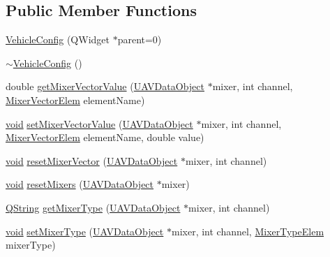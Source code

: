 \subsection*{\-Public \-Member \-Functions}
\begin{DoxyCompactItemize}
\item 
\hyperlink{group___config_plugin_ga369dba1a2bcda89963b25078cbf89fd9}{\-Vehicle\-Config} (\-Q\-Widget $\ast$parent=0)
\item 
\hyperlink{group___config_plugin_ga440451fa05e53fc37b5dfafc439cd681}{$\sim$\-Vehicle\-Config} ()
\item 
double \hyperlink{group___config_plugin_ga0d65103b0dfd7aa3d3fca584cdda0a3f}{get\-Mixer\-Vector\-Value} (\hyperlink{class_u_a_v_data_object}{\-U\-A\-V\-Data\-Object} $\ast$mixer, int channel, \hyperlink{group___config_plugin_ga819f8f1846be72af33b5c567259335fe}{\-Mixer\-Vector\-Elem} element\-Name)
\item 
\hyperlink{group___u_a_v_objects_plugin_ga444cf2ff3f0ecbe028adce838d373f5c}{void} \hyperlink{group___config_plugin_ga1c43f32f9f928991460ed7491d048ca1}{set\-Mixer\-Vector\-Value} (\hyperlink{class_u_a_v_data_object}{\-U\-A\-V\-Data\-Object} $\ast$mixer, int channel, \hyperlink{group___config_plugin_ga819f8f1846be72af33b5c567259335fe}{\-Mixer\-Vector\-Elem} element\-Name, double value)
\item 
\hyperlink{group___u_a_v_objects_plugin_ga444cf2ff3f0ecbe028adce838d373f5c}{void} \hyperlink{group___config_plugin_ga0e4c15b064550ea0899ed4e641ebb635}{reset\-Mixer\-Vector} (\hyperlink{class_u_a_v_data_object}{\-U\-A\-V\-Data\-Object} $\ast$mixer, int channel)
\item 
\hyperlink{group___u_a_v_objects_plugin_ga444cf2ff3f0ecbe028adce838d373f5c}{void} \hyperlink{group___config_plugin_ga2d8c952fda6b946cc3e0d184830c16f4}{reset\-Mixers} (\hyperlink{class_u_a_v_data_object}{\-U\-A\-V\-Data\-Object} $\ast$mixer)
\item 
\hyperlink{group___u_a_v_objects_plugin_gab9d252f49c333c94a72f97ce3105a32d}{\-Q\-String} \hyperlink{group___config_plugin_ga701b45580113989b2875514df233a598}{get\-Mixer\-Type} (\hyperlink{class_u_a_v_data_object}{\-U\-A\-V\-Data\-Object} $\ast$mixer, int channel)
\item 
\hyperlink{group___u_a_v_objects_plugin_ga444cf2ff3f0ecbe028adce838d373f5c}{void} \hyperlink{group___config_plugin_ga060909ce68f927e2b3f6d7b14d36a3b8}{set\-Mixer\-Type} (\hyperlink{class_u_a_v_data_object}{\-U\-A\-V\-Data\-Object} $\ast$mixer, int channel, \hyperlink{group___config_plugin_ga28ebdbd14bc688c9a87376caeffd32e9}{\-Mixer\-Type\-Elem} mixer\-Type)

\end{DoxyCompactItemize}
